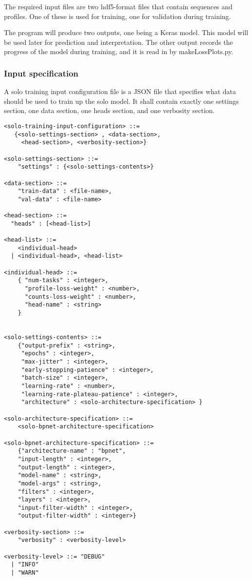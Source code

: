 \documentclass{article}
\begin{document}
The required input files are two hdf5-format files that contain sequences and profiles. One of these is used for training, one for validation during training. 

The program will produce two outputs, one being a Keras model. This model will be used later for prediction and interpretation. The other output records the progress of the model during training, and it is read in by makeLossPlots.py. 


\subsubsection{Input specification}

A solo training input configuration file is a JSON file that specifies what data should be used to train up the solo model.
It shall contain exactly one settings section, one data section, one heads section, and one verbosity section. 

\begin{lstlisting}
<solo-training-input-configuration> ::= 
   {<solo-settings-section> , <data-section>, 
     <head-section>, <verbosity-section>}

<solo-settings-section> ::= 
    "settings" : {<solo-settings-contents>}

<data-section> ::= 
    "train-data" : <file-name>,
    "val-data" : <file-name>

<head-section> ::= 
  "heads" : [<head-list>]

<head-list> ::= 
    <individual-head>
  | <individual-head>, <head-list>

<individual-head> ::=
    { "num-tasks" : <integer>,
      "profile-loss-weight" : <number>,
      "counts-loss-weight" : <number>,
      "head-name" : <string>
    }


<solo-settings-contents> ::= 
    {"output-prefix" : <string>, 
     "epochs" : <integer>, 
     "max-jitter" : <integer>,
     "early-stopping-patience" : <integer>, 
     "batch-size" : <integer>, 
     "learning-rate" : <number>, 
     "learning-rate-plateau-patience" : <integer>,
     "architecture" : <solo-architecture-specification> } 

<solo-architecture-specification> ::= 
    <solo-bpnet-architecture-specification>

<solo-bpnet-architecture-specification> ::= 
    {"architecture-name" : "bpnet",
    "input-length" : <integer>, 
    "output-length" : <integer>,
    "model-name" : <string>,
    "model-args" : <string>,
    "filters" : <integer>,
    "layers" : <integer>,
    "input-filter-width" : <integer>,
    "output-filter-width" : <integer>}

<verbosity-section> ::= 
    "verbosity" : <verbosity-level>

<verbosity-level> ::= "DEBUG"
  | "INFO"
  | "WARN"
\end{lstlisting}
\end{document}
